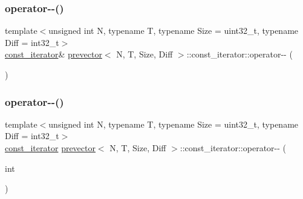 \subsubsection{\texorpdfstring{operator-\/-\/()}{operator--()}\hspace{0.1cm}{\footnotesize\ttfamily [1/2]}}
{\footnotesize\ttfamily template$<$unsigned int N, typename T, typename Size = uint32\+\_\+t, typename Diff = int32\+\_\+t$>$ \\
\mbox{\hyperlink{classprevector_1_1const__iterator}{const\+\_\+iterator}}\& \mbox{\hyperlink{classprevector}{prevector}}$<$ N, T, Size, Diff $>$\+::const\+\_\+iterator\+::operator-\/-\/ (\begin{DoxyParamCaption}{ }\end{DoxyParamCaption})\hspace{0.3cm}{\ttfamily [inline]}}

\mbox{\label{classprevector_1_1const__iterator_a37d0e4597843c23ba8e31e5526851728}} 
\subsubsection{\texorpdfstring{operator-\/-\/()}{operator--()}\hspace{0.1cm}{\footnotesize\ttfamily [2/2]}}
{\footnotesize\ttfamily template$<$unsigned int N, typename T, typename Size = uint32\+\_\+t, typename Diff = int32\+\_\+t$>$ \\
\mbox{\hyperlink{classprevector_1_1const__iterator}{const\+\_\+iterator}} \mbox{\hyperlink{classprevector}{prevector}}$<$ N, T, Size, Diff $>$\+::const\+\_\+iterator\+::operator-\/-\/ (\begin{DoxyParamCaption}\item[{int}]{ }\end{DoxyParamCaption})\hspace{0.3cm}{\ttfamily [inline]}}

\mbox{\label{classprevector_1_1const__iterator_a81c8256a4d09d3e7577a76906428ce3c}} 
